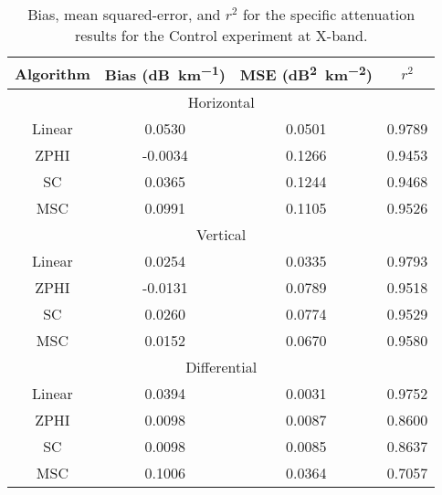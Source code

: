\begin{table}
    \centering
    \begin{tabular}{| c | c | c | c |}
        \hline
        Algorithm & Bias (\si{dB\per \kilo\meter}) & MSE (\si{dB\squared \per \kilo\meter \squared}) & $r^2$ \\
        \hline
        \hline
        \multicolumn{4}{|c|}{Horizontal}\\
        \hline
        Linear & 0.0530 & 0.0501 & 0.9789\\
        ZPHI & -0.0034 & 0.1266 & 0.9453\\
        SC & 0.0365 & 0.1244 & 0.9468\\
        MSC & 0.0991 & 0.1105 & 0.9526\\
        \hline
        \multicolumn{4}{|c|}{Vertical}\\
        \hline
        Linear & 0.0254 & 0.0335 & 0.9793\\
        ZPHI & -0.0131 & 0.0789 & 0.9518\\
        SC & 0.0260 & 0.0774 & 0.9529\\
        MSC & 0.0152 & 0.0670 & 0.9580\\
        \hline
        \multicolumn{4}{|c|}{Differential}\\
        \hline
        Linear & 0.0394 & 0.0031 & 0.9752\\
        ZPHI & 0.0098 & 0.0087 & 0.8600\\
        SC & 0.0098 & 0.0085 & 0.8637\\
        MSC & 0.1006 & 0.0364 & 0.7057\\
\hline
    \end{tabular}
    \caption{Bias, mean squared-error, and $r^2$ for the specific attenuation
    results for the Control experiment at X-band.}
    \label{tab:X-stats-Control}
\end{table}
